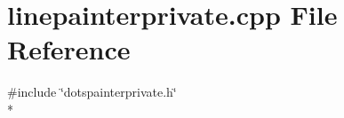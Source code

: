 \section{linepainterprivate.\+cpp File Reference}
\label{bk3_2curve_2painters_2linepainterprivate_8cpp}
{\ttfamily \#include \char`\"{}dotspainterprivate.\+h\char`\"{}}\\*
